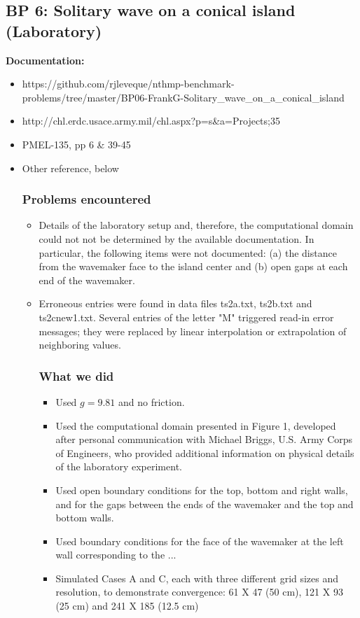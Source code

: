 \subsection{BP 6:
 Solitary wave on a conical island (Laboratory)}

{\bf Documentation:}
\begin {itemize}

\item https://github.com/rjleveque/nthmp-benchmark-problems/tree/master/BP06-FrankG-Solitary_wave_on_a_conical_island
\item http://chl.erdc.usace.army.mil/chl.aspx?p=s&a=Projects;35
\item PMEL-135, pp 6 \& 39-45
\item Other reference, below

\subsubsection {Problems encountered}

\begin {itemize}
\item Details of the laboratory setup and, therefore, the computational domain could not not be determined by the available documentation.  In particular, the following items were not documented: (a) the distance from the wavemaker face to the island center and (b) open gaps at each end of the wavemaker.
\item Erroneous entries were found in data files ts2a.txt, ts2b.txt and ts2cnew1.txt.  Several entries of the letter "M" triggered read-in error messages; they were replaced by linear interpolation or extrapolation of neighboring values.

\subsubsection{What we did}

\begin{itemize}
\item Used $g=9.81$ and no friction.
\item Used the computational domain presented in Figure 1, developed after personal communication with Michael Briggs, U.S. Army Corps of Engineers, who  provided additional information on physical details of the laboratory experiment.
\item Used open boundary conditions for the top, bottom and right walls, and for the gaps between the ends of the wavemaker and the top and bottom walls.
\item Used boundary conditions for the face of the wavemaker at the left wall corresponding to the ...  
\item Simulated Cases A and C, each with three different grid sizes and resolution, to demonstrate convergence:  61 X 47 (50 cm), 121 X 93 (25 cm) and 241 X 185 (12.5 cm)


\end{itemize}
\end{itemize}
\end{itemize}
